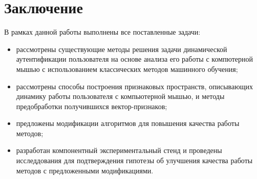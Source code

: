 \documentclass[12pt]{article}
\begin{document}
    \newpage



    \section{Заключение}
    \label{sec:Conclusion}

    \par В рамках данной работы выполнены все поставленные задачи:

    \begin{itemize}
        \item рассмотрены существующие методы решения задачи динамической аутентификации пользователя на основе анализа его работы с компютерной мышью с использованием классических методов машинного обучения;
        \item рассмотрены способы построения признаковых пространств, описывающих динамику работы пользователя с компьютерной мышью, и методы предобработки получившихся вектор-признаков;
        \item предложены модификации алгоритмов для повышения качества работы методов;
        \item разработан компонентный экспериментальный стенд и проведены исследдования для подтверждения гипотезы об улучшения качества работы методов с предложенными модификациями.
    \end{itemize}

    \newpage
\end{document}
